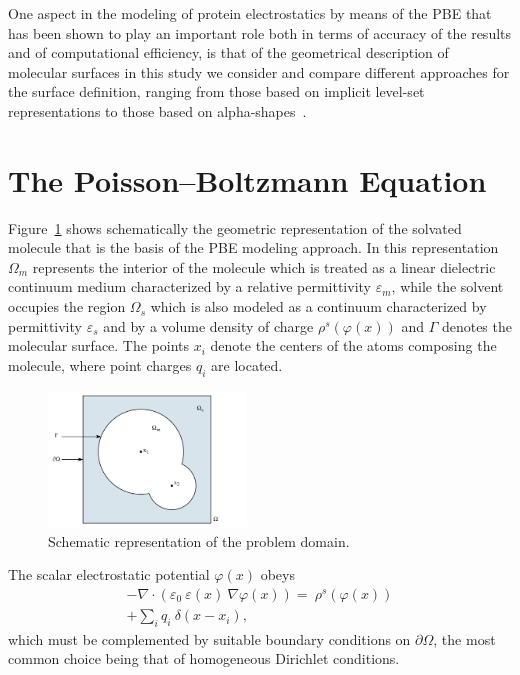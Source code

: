 \documentclass[11pt,a4paper,twocolumn]{article}
\begin{document}
One aspect in the modeling of protein electrostatics by means of the PBE that 
has been shown to play an important role both in terms of accuracy of the results
and of computational efficiency, is that of the geometrical description of molecular
surfaces in this study we consider and compare different approaches for the surface
definition, ranging from those based on implicit level-set representations to those
based on alpha-shapes~\cite{ref8,ref9}.

\section{The Poisson--Boltzmann E\-qua\-tion}
\label{sec:pbe}



Figure~\ref{fig:1} shows schematically the geometric 
representation
of the solvated molecule that is the basis of the PBE 
modeling approach. In this representation $ \Omega_m $ 
represents the interior of the molecule which is treated as 
a linear dielectric continuum
medium characterized by a relative permittivity 
$\varepsilon_m$,
while the solvent occupies the region $ \Omega_s $ which is
also modeled as a continuum characterized by permittivity 
$\varepsilon_s$ and by a volume density of charge 
$\rho^s(\varphi(x))$
and $\Gamma$ denotes the molecular surface. 
The points $x_i$ denote 
the centers of the atoms composing the molecule, 
where point charges $q_i$
are located.
\begin{figure}[H]
    \centering
    \includegraphics[width=0.47\textwidth]
    {Images/dominio.jpg}
    \caption{Schematic representation of the problem 
    domain.}
\label{fig:1}
\end{figure}
The scalar electrostatic potential $\varphi(x)$ obeys
\begin{equation}
\begin{split}
    \label{eq:pbestart}
    -\nabla \cdot \left(\varepsilon_0\ \varepsilon(x)\ 
    \nabla \varphi(x) \right)  =\
    \rho^s(\varphi(x)) \\ 
    + \sum_i q_i\ \delta(x-x_i),
\end{split}
\end{equation}
which must be complemented by suitable boundary conditions 
on $\partial \Omega$, the most common choice being that of 
homogeneous Dirichlet conditions.
\end{document}

